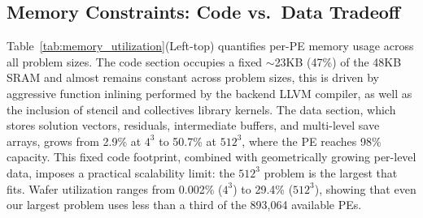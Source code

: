 \documentclass[conference]{IEEEtran}
\begin{document}

        \subsection{Memory Constraints: Code vs.\ Data Tradeoff}
            Table~\ref{tab:memory_utilization}(Left-top) quantifies per-PE memory usage across all problem sizes. The code section occupies a fixed ${\sim}$23KB (47\%) of the 48KB SRAM and almost remains constant across problem sizes, this is driven by aggressive function inlining performed by the backend LLVM compiler, as well as the inclusion of stencil and collectives library kernels. The data section, which stores solution vectors, residuals, intermediate buffers, and multi-level save arrays, grows from 2.9\% at $4^3$ to 50.7\% at $512^3$, where the PE reaches 98\% capacity. This fixed code footprint, combined with geometrically growing per-level data, imposes a practical scalability limit: the $512^3$ problem is the largest that fits. Wafer utilization ranges from 0.002\% ($4^3$) to 29.4\% ($512^3$), showing that even our largest problem uses less than a third of the 893,064 available PEs.
            
\end{document}
